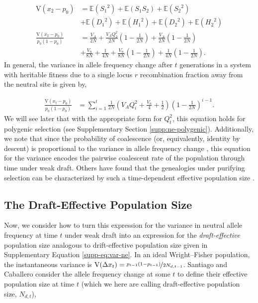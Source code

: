 \documentclass[11pt]{article}
\newcommand{\E}{\mathbb{E}}
\newcommand{\V}{\text{V}}
\begin{document}
\begin{align}
    \label{eq:vardecay}
  \V(x_2 - p_0) &= \E({S_1}^2) + \E(S_1 S_2) + \E({S_2}^2) \nonumber \\
                  & + \E({D_1}^2) + \E({H_1}^2) + \E({D_2}^2) + \E({H_2}^2) \nonumber \\
  \frac{\V(x_2 - p_0)}{p_0(1-p_0)} &= \frac{V_A}{2N} + \frac{V_A Q_2^2}{2N}\left(1-\frac{1}{2N}\right)  +  \frac{V_A}{2N}  \left(1-\frac{1}{2N}\right)  \nonumber \\ 
                                     &+ \frac{V_n}{8N} + \frac{1}{4N} + \frac{V_n}{8N}  \left(1 - \frac{1}{2N}\right) 
+ \frac{1}{4N} \left(1 - \frac{1}{2N}\right).
\end{align}
%
In general, the variance in allele frequency change after $t$ generations in a
system with heritable fitness due to a single locus $r$ recombination fraction
away from the neutral site is given by,

\begin{align}
  \label{supp-eq:var-xt}
  \frac{\V(x_t - p_0)}{p_0(1-p_0)} &= \sum_{i=1}^t \frac{1}{2 N} \left(V_A Q_i^2 + \frac{V_n}{4} + \frac{1}{2} \right) \left(1-\frac{1}{2 N}\right)^{i-1}.
\end{align}
%
We will see later that with the appropriate form for $Q_t^2$, this equation
holds for polygenic selection (see Supplementary Section
\ref{supp:ne-polygenic}). Additionally, we note that since the probability of
coalescence (or, equivalently, identity by descent) is proportional to the
variance in allele frequency change \parencite{Barton2000-zg}, this equation
for the variance encodes the pairwise coalescent rate of the population through
time under weak draft. Others have found that the genealogies under purifying
selection can be characterized by such a time-dependent effective population
size \parencite{Nicolaisen2013-gv}.


\subsection{The Draft-Effective Population Size}

Now, we consider how to turn this expression for the variance in neutral allele
frequency at time $t$ under weak draft into an expression for the
\emph{draft-effective} population size analogous to drift-effective population
size given in Supplementary Equation \eqref{supp-eq:var-ne}. In an ideal
Wright--Fisher population, the instantaneous variance is $\V(\Delta x_t) =
\nicefrac{p_{t-1}(1-p_{t-1})}{2N_{d,t-1}}$. Santiago and Caballero consider the
allele frequency change at some $t$ to define their effective population size
at time $t$ (which we here are calling draft-effective population size,
$N_{d,t}$),
\end{document}
